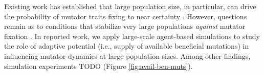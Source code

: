 Existing work has established that large population size, in particular, can drive the probability of mutator traits fixing to near certainty \citep{raynes2018sign,tenaillon1999mutators}.
However, questions remain as to conditions that stabilize very large populations \textit{against} mutator fixation \citep{raynes2019migration}.
In reported work, we apply large-scale agent-based simulations to study the role of adaptive potential (i.e., supply of available beneficial mutations) in influencing mutator dynamics at large population sizes.
Among other findings, simulation experiments TODO (Figure \ref{fig:avail-ben-muts}).




